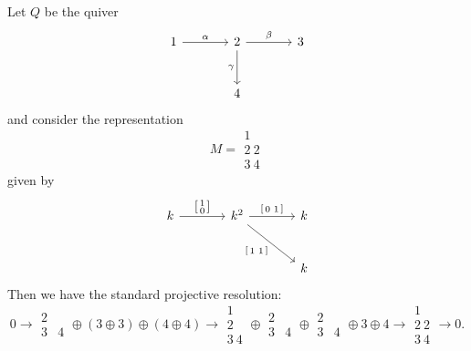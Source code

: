 \documentclass[11pt, a4paper]{report}
\begin{document}
    \begin{example}
    Let $Q$ be the quiver
    \[
    \begin{tikzcd}[ampersand replacement=\&, row sep=large, column sep=large]
    1 \arrow[r, "\alpha"] \& 2 \arrow[r, "\beta"] \arrow[d, "\gamma"'] \& 3 \\
    \& 4
    \end{tikzcd}
    \]
    and consider the representation
    \[
    M=
    \begin{matrix}
    1\\
    2\ 2\\
    3\ 4
    \end{matrix}
    \]
    given by
    \[
    \begin{tikzcd}[ampersand replacement=\&, row sep=large, column sep=large]
    k \arrow[r, "{\left[\begin{smallmatrix}1\\0\end{smallmatrix}\right]}"] \&
    k^2 \arrow[r, "{\left[\begin{smallmatrix}0&1\end{smallmatrix}\right]}"]
         \arrow[rd, "{\left[\begin{smallmatrix}1&1\end{smallmatrix}\right]}"'] \&
    k \\
    \& \& k
    \end{tikzcd}
    \]
    Then we have the standard projective resolution:
    \[
    0 \longrightarrow
 \begin{matrix} 2  \\ 3&4 \end{matrix}\oplus (3\oplus 3)\oplus (4\oplus 4)
    \longrightarrow
    \begin{matrix}
    1\\
    2\\
    3\ 4
    \end{matrix}
    \oplus
 \begin{matrix} 2  \\ 3&4 \end{matrix}
    \oplus
 \begin{matrix} 2  \\ 3&4 \end{matrix}
    \oplus 3 \oplus 4
    \longrightarrow
    \begin{matrix}
    1\\
    2\ 2\\
    3\ 4
    \end{matrix}
    \longrightarrow 0.
    \]


\end{example}
\end{document}
